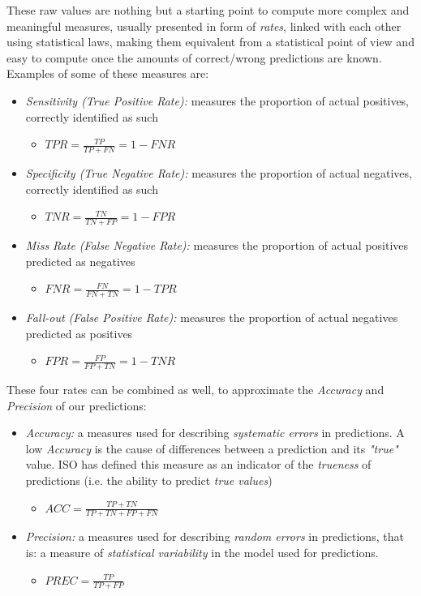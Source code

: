 \vspace{0.5cm}

These raw values are nothing but a starting point to compute more complex and meaningful measures, usually presented in form of \textsl{rates}, linked with each other using statistical laws, making them equivalent from a statistical point of view and easy to compute once the amounts of correct/wrong predictions are known. Examples of some of these measures are:

\begin{itemize}
	\item \textsl{Sensitivity (True Positive Rate):} measures the proportion of actual positives, correctly identified as such
	\begin{itemize}
		\item[] $TPR = \frac{TP}{TP+FN} = 1-FNR$
	\end{itemize}
	\item \textsl{Specificity (True Negative Rate):} measures the proportion of actual negatives, correctly identified as such
	\begin{itemize}
		\item[] $TNR = \frac{TN}{TN+FP} = 1-FPR$
	\end{itemize}
	\item \textsl{Miss Rate (False Negative Rate):} measures the proportion of actual positives predicted as negatives
	\begin{itemize}
		\item[] $FNR = \frac{FN}{FN+TN} = 1-TPR$
	\end{itemize}
	\item \textsl{Fall-out (False Positive Rate):} measures the proportion of actual negatives predicted as positives
	\begin{itemize}
		\item[] $FPR = \frac{FP}{FP+TN} = 1-TNR$
	\end{itemize}
\end{itemize}

These four rates can be combined as well, to approximate the \textsl{Accuracy} and \textsl{Precision} of our predictions:

\begin{itemize}
	\item \textsl{Accuracy:} a measures used for describing \textsl{systematic errors} in predictions. A low \textsl{Accuracy} is the cause of differences between a prediction and its \textsl{"true"} value. ISO has defined this measure as an indicator of the \textsl{trueness} of predictions (i.e. the ability to predict \textsl{true values}) \cite{isoacc}
	\begin{itemize}
		\item[] $ACC = \frac{TP+TN}{TP+TN+FP+FN}$
	\end{itemize}
	\item \textsl{Precision:} a measures used for describing \textsl{random errors} in predictions, that is: a measure of \textsl{statistical variability} in the model used for predictions.
	\begin{itemize}
	\item[] $PREC = \frac{TP}{TP+FP}$
	\end{itemize}
\end{itemize}

